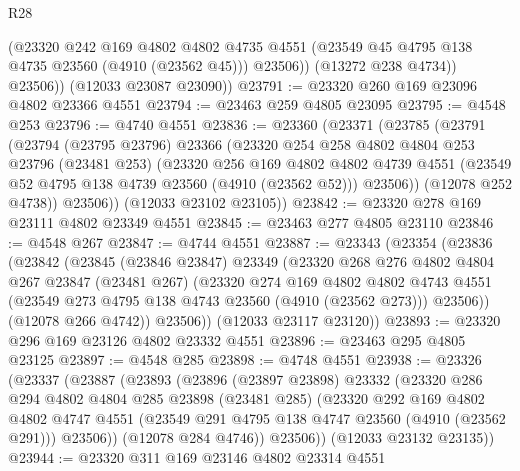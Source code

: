 \begin{lexlean}{R28}
\begin{coremodule}
              (@23320
                @242
                @169
                @4802
                @4802
                @4735
                @4551
                (@23549 @45 @4795 @138 @4735 @23560 (@4910 (@23562 @45)))
                @23506))
            (@13272 @238 @4734))
          @23506))
      (@12033 @23087 @23090))
@23791 := @23320 @260 @169 @23096 @4802 @23366 @4551
@23794 := @23463 @259 @4805 @23095
@23795 := @4548 @253
@23796 := @4740 @4551
@23836 := @23360
    (@23371
      (@23785
        (@23791
          (@23794
            (@23795 @23796)
            @23366
            (@23320
              @254
              @258
              @4802
              @4804
              @253
              @23796
              (@23481 @253)
              (@23320
                @256
                @169
                @4802
                @4802
                @4739
                @4551
                (@23549 @52 @4795 @138 @4739 @23560 (@4910 (@23562 @52)))
                @23506))
            (@12078 @252 @4738))
          @23506))
      (@12033 @23102 @23105))
@23842 := @23320 @278 @169 @23111 @4802 @23349 @4551
@23845 := @23463 @277 @4805 @23110
@23846 := @4548 @267
@23847 := @4744 @4551
@23887 := @23343
    (@23354
      (@23836
        (@23842
          (@23845
            (@23846 @23847)
            @23349
            (@23320
              @268
              @276
              @4802
              @4804
              @267
              @23847
              (@23481 @267)
              (@23320
                @274
                @169
                @4802
                @4802
                @4743
                @4551
                (@23549 @273 @4795 @138 @4743 @23560 (@4910 (@23562 @273)))
                @23506))
            (@12078 @266 @4742))
          @23506))
      (@12033 @23117 @23120))
@23893 := @23320 @296 @169 @23126 @4802 @23332 @4551
@23896 := @23463 @295 @4805 @23125
@23897 := @4548 @285
@23898 := @4748 @4551
@23938 := @23326
    (@23337
      (@23887
        (@23893
          (@23896
            (@23897 @23898)
            @23332
            (@23320
              @286
              @294
              @4802
              @4804
              @285
              @23898
              (@23481 @285)
              (@23320
                @292
                @169
                @4802
                @4802
                @4747
                @4551
                (@23549 @291 @4795 @138 @4747 @23560 (@4910 (@23562 @291)))
                @23506))
            (@12078 @284 @4746))
          @23506))
      (@12033 @23132 @23135))
@23944 := @23320 @311 @169 @23146 @4802 @23314 @4551

\end{coremodule}
\end{lexlean}
